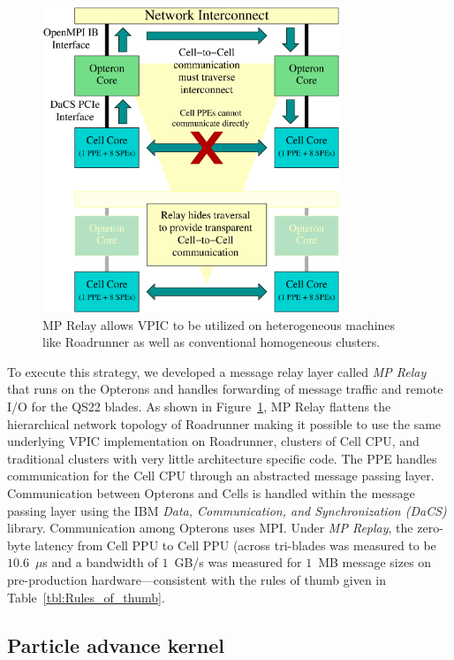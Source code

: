 \documentclass[journal,twoside]{IEEEtran}
\newcommand{\tbl}[1]{Table~\ref{tbl:#1}}
\newcommand{\fig}[1]{Figure~\ref{fig:#1}}
\begin{document}
\begin{figure}
\begin{center}
\includegraphics[width=3.5in]{figs/relay.eps}
\caption{MP Relay allows VPIC to be utilized on heterogeneous
machines like Roadrunner as well as conventional homogeneous
clusters.}
\label{fig:relay}
\end{center}
\end{figure}

To execute this strategy, we developed a message relay layer called
\emph{MP Relay} that runs on the Opterons and handles forwarding of
message traffic and remote I/O for the QS22 blades.  As shown in
\fig{relay}, MP Relay flattens the hierarchical network topology of
Roadrunner making it possible to use the same underlying VPIC
implementation on Roadrunner, clusters of Cell CPU, and traditional
clusters with very little architecture specific code.  The PPE handles
communication for the Cell CPU through an abstracted message passing
layer.  Communication between Opterons and Cells is handled within the
message passing layer using the IBM \emph{Data, Communication, and
Synchronization (DaCS)} library.  Communication among Opterons uses
MPI.  Under \emph{MP Replay}, the zero-byte latency from Cell PPU to
Cell PPU (across tri-blades was measured to be $10.6$~$\mu$s and a
bandwidth of $1$~GB/s was measured for $1$~MB message sizes on
pre-production hardware---consistent with the rules of thumb given in
\tbl{Rules_of_thumb}.

\subsection{Particle advance kernel}
\end{document}
